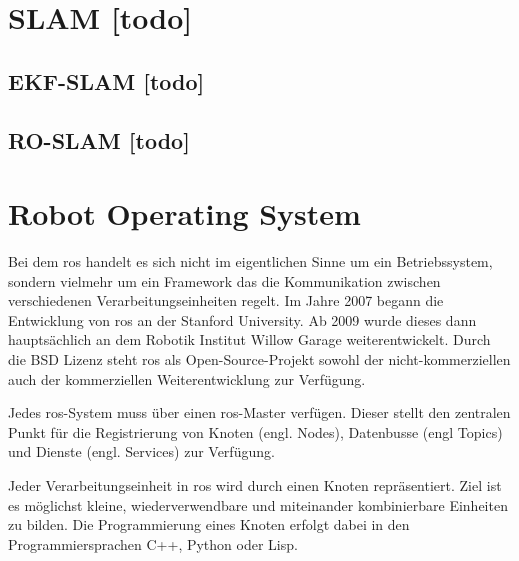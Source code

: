 \section{SLAM [todo]}



%
%
%
\subsection{EKF-SLAM [todo]}


%
%
%
\subsection{RO-SLAM [todo]}


%
%
\section{Robot Operating System}

Bei dem \Gls{ros} handelt es sich nicht im eigentlichen Sinne um ein Betriebssystem, sondern vielmehr um ein Framework das die Kommunikation zwischen verschiedenen Verarbeitungseinheiten regelt. Im Jahre 2007 begann die Entwicklung von \Gls{ros} an der Stanford University. Ab 2009 wurde dieses dann hauptsächlich an dem Robotik Institut Willow Garage weiterentwickelt. Durch die BSD Lizenz steht \Gls{ros} als Open-Source-Projekt sowohl der nicht-kommerziellen auch der kommerziellen Weiterentwicklung zur Verfügung. \cite{quigley2009ros}

Jedes \Gls{ros}-System muss über einen \Gls{ros}-Master verfügen. Dieser stellt den zentralen Punkt für die Registrierung von Knoten (engl. Nodes), Datenbusse (engl Topics) und Dienste (engl. Services) zur Verfügung.

Jeder Verarbeitungseinheit in \Gls{ros} wird durch einen Knoten repräsentiert. Ziel ist es möglichst kleine, wiederverwendbare und miteinander kombinierbare Einheiten zu bilden. Die Programmierung eines Knoten erfolgt dabei in den Programmiersprachen C++, Python oder Lisp.

